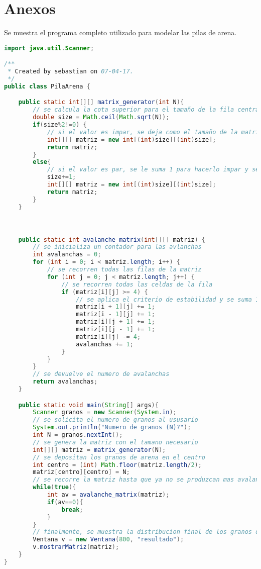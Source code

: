 \documentclass[letterpaper,11pt]{article} %
\begin{document}
\newpage

\section{Anexos}
Se muestra el programa completo utilizado para modelar las pilas de arena.
\lstset{style=Java}
\begin{lstlisting}[language=Java, caption=Loop del recorrido de la matriz]
import java.util.Scanner;

/**
 * Created by sebastian on 07-04-17.
 */
public class PilaArena {

    public static int[][] matrix_generator(int N){
        // se calcula la cota superior para el tamaño de la fila central
        double size = Math.ceil(Math.sqrt(N));
        if(size%2!=0) {
            // si el valor es impar, se deja como el tamaño de la matriz
            int[][] matriz = new int[(int)size][(int)size];
            return matriz;
        }
        else{
            // si el valor es par, se le suma 1 para hacerlo impar y se crea la matriz
            size+=1;
            int[][] matriz = new int[(int)size][(int)size];
            return matriz;
        }
    }



    public static int avalanche_matrix(int[][] matriz) {
        // se inicializa un contador para las avlanchas
        int avalanchas = 0;
        for (int i = 0; i < matriz.length; i++) {
            // se recorren todas las filas de la matriz
            for (int j = 0; j < matriz.length; j++) {
                // se recorren todas las celdas de la fila
                if (matriz[i][j] >= 4) {
                    // se aplica el criterio de estabilidad y se suma 1 al numero de avalanchas
                    matriz[i + 1][j] += 1;
                    matriz[i - 1][j] += 1;
                    matriz[i][j + 1] += 1;
                    matriz[i][j - 1] += 1;
                    matriz[i][j] -= 4;
                    avalanchas += 1;
                }
            }
        }
        // se devuelve el numero de avalanchas
        return avalanchas;
    }

    public static void main(String[] args){
        Scanner granos = new Scanner(System.in);
        // se solicita el numero de granos al ususario
        System.out.println("Numero de granos (N)?");
        int N = granos.nextInt();
        // se genera la matriz con el tamano necesario
        int[][] matriz = matrix_generator(N);
        // se depositan los granos de arena en el centro
        int centro = (int) Math.floor(matriz.length/2);
        matriz[centro][centro] = N;
        // se recorre la matriz hasta que ya no se produzcan mas avalanchas
        while(true){
            int av = avalanche_matrix(matriz);
            if(av==0){
                break;
            }
        }
        // finalmente, se muestra la distribucion final de los granos de arena 
        Ventana v = new Ventana(800, "resultado");
        v.mostrarMatriz(matriz);
    }
}

\end{lstlisting}
\end{document}
